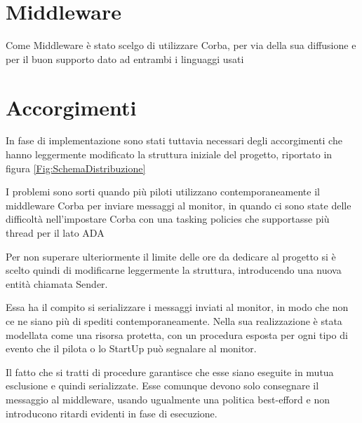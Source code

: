 \documentclass[a4paper,11pt, twoside]{book}
\begin{document}
    \section{Middleware}
      Come Middleware è stato scelgo di utilizzare Corba, per via della sua diffusione e per il buon supporto dato
      ad entrambi i linguaggi usati
      
    \section{Accorgimenti}
      In fase di implementazione sono stati tuttavia necessari degli accorgimenti che hanno leggermente modificato la struttura 
      iniziale del progetto, riportato in figura \ref{Fig:SchemaDistribuzione}
      
      I problemi sono sorti quando più piloti utilizzano contemporaneamente il middleware Corba per 
      inviare messaggi al monitor, in quando
      ci sono state delle difficoltà nell'impostare Corba con una tasking policies che supportasse più thread per il lato ADA
      
      Per non superare ulteriormente il limite delle ore da dedicare al progetto si è scelto quindi di modificarne leggermente
      la struttura, introducendo una nuova entità chiamata Sender.
      
      Essa ha il compito si serializzare i messaggi inviati al monitor, in modo che non ce ne siano più di spediti
      contemporaneamente. Nella sua realizzazione è stata modellata come una risorsa protetta, con un procedura esposta per
      ogni tipo di evento che il pilota o lo StartUp può segnalare al monitor.
      
      
      
      Il fatto che si tratti di procedure garantisce che esse siano eseguite in mutua esclusione e quindi serializzate.
      Esse comunque devono solo consegnare il messaggio al middleware, usando ugualmente una politica best-efford
      e non introducono ritardi evidenti in fase di esecuzione.
      
\end{document}
